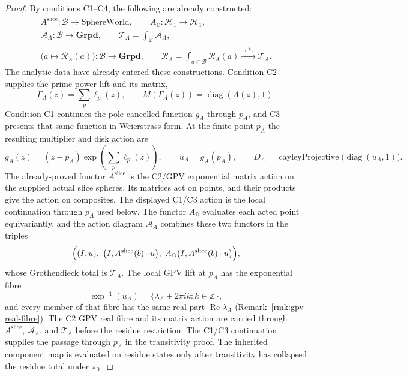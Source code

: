 \documentclass[11pt]{article}
\newcommand{\OO}{\mathbb{O}}
\newcommand{\ZZ}{\mathbb{Z}}
\providecommand{\SphereWorld}{\mathrm{SphereWorld}}
\theoremstyle{plain}
\theoremstyle{definition}
\theoremstyle{remark}
\begin{document}
\begin{proof}
By conditions \textup{C1--C4}, the following are already constructed:
\[
\begin{gathered}
 A^{\mathrm{slice}}:\mathcal B\longrightarrow\SphereWorld,
 \qquad
 A_{\OO}:\mathcal H_1\longrightarrow\mathcal H_1,\\
 \mathcal A_A:\mathcal B\longrightarrow\mathbf{Grpd},
 \qquad
 \mathcal T_A=\displaystyle\int_{\mathcal B}\mathcal A_A,\\
 \bigl(a\longmapsto\mathcal R_A(a)\bigr):
   \mathcal B\longrightarrow\mathbf{Grpd},
 \qquad
 \mathcal R_A=\displaystyle\int_{a\in\mathcal B}\mathcal R_A(a)
   \xrightarrow{\ \int\iota_A\ }\mathcal T_A.
\end{gathered}                                         \tag{C}\label{eq:concentricity-built-chain}
\]
The analytic data have already entered these constructions. Condition
\textup{C2} supplies the prime-power lift and its matrix,
\[
 \Gamma_A(z)=\sum_p\ell_p(z),\qquad
 M(\Gamma_A(z))=\operatorname{diag}(A(z),1).
\]
Condition \textup{C1} continues the pole-cancelled function $g_A$ through
$p_A$, and \textup{C3} presents that same function in Weierstrass form.
At the finite point $p_A$ the resulting multiplier and disk action are
\[
 g_A(z)=(z-p_A)\exp\!\left(\sum_p\ell_p(z)\right),\qquad
 u_A=g_A(p_A),\qquad
 D_A=\operatorname{cayleyProjective}
       \bigl(\operatorname{diag}(u_A,1)\bigr).          \tag{D}\label{eq:concentricity-action-recap}
\]
The already-proved functor $A^{\mathrm{slice}}$ is the C2/GPV exponential
matrix action on the supplied actual slice spheres. Its matrices act on
points, and their products give the action on composites. The displayed
C1/C3 action is the local continuation through $p_A$ used below.
The functor $A_{\OO}$ evaluates each acted point equivariantly, and the
action diagram $\mathcal A_A$ combines these two functors in the triples
\[
 \Bigl((I,u),\ \bigl(I,A^{\mathrm{slice}}(b)\mathbin{\cdot}u\bigr),\
 A_{\OO}\bigl(I,A^{\mathrm{slice}}(b)\mathbin{\cdot}u\bigr)\Bigr),
\]
whose Grothendieck total is $\mathcal T_A$. The local GPV lift at $p_A$
has the exponential fibre
\[
 \exp^{-1}(u_A)=\{\lambda_A+2\pi ik:k\in\ZZ\},
\]
and every member of that fibre has the same real part
$\operatorname{Re}\lambda_A$ (Remark~\ref{rmk:gpv-real-fibre}). The C2
GPV real fibre and its matrix action are carried through
$A^{\mathrm{slice}}$, $\mathcal A_A$, and $\mathcal T_A$ before the
residue restriction. The C1/C3 continuation supplies the passage through
$p_A$ in the transitivity proof. The inherited component map is evaluated
on residue states only after transitivity has collapsed the residue total
under $\pi_0$.


\end{proof}
\end{document}
